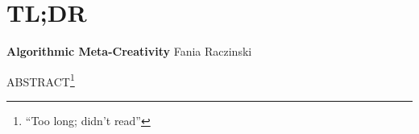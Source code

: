 
\pagestyle{empty}

\chapter{TL;DR}
\label{abstract}

{\Large \textbf{Algorithmic Meta-Creativity}}
Fania Raczinski

\vspace{0.5cm}
ABSTRACT\footnote{``Too long; didn't read''}

\lipsum[1-2]

\clearpage
